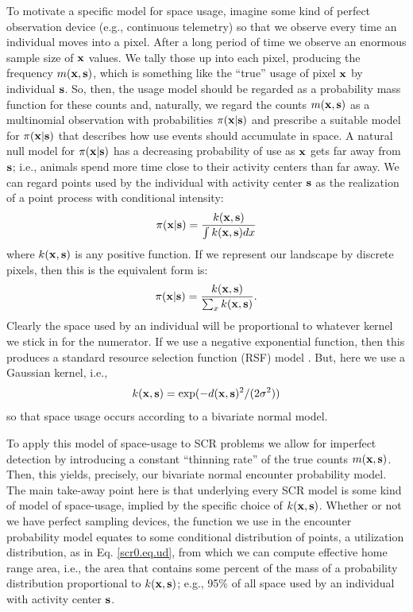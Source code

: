 To motivate a specific model for space usage, imagine some kind of
perfect observation device (e.g., continuous telemetry) so that we
observe every time an individual moves into a pixel. After a long
period of time we observe an enormous sample size of ${\bf x}$
values. We tally those up into each pixel, producing the frequency
$m({\bf x},{\bf s})$, which is something like the ``true'' usage of
pixel ${\bf x}$ by individual ${\bf s}$.  So, then, the usage model should be regarded as a probability
mass function for these counts and, naturally, we regard the counts
$m({\bf x},{\bf s})$
as a multinomial observation with probabilities $\pi({\bf x}|{\bf s})$ and
prescribe a suitable model for $\pi({\bf x}|{\bf s})$ that describes how use
events should accumulate in space. A natural null model for
$\pi({\bf x}|{\bf s})$ has a decreasing probability of use as ${\bf x}$ gets far away
from ${\bf s}$; i.e., animals spend more time close to their activity
centers than far away.
We can regard points used by the individual
with activity center ${\bf s}$ as the realization of a point process with
conditional intensity:
\[
\pi({\bf x}|{\bf s}) =  \frac{ k({\bf x},{\bf s}) }{ \int k({\bf
    x},{\bf s}) dx }
\]
where $k({\bf x},{\bf s})$ is any positive function.
If we represent our landscape by discrete pixels, then this is the
equivalent form is:
\begin{equation}
\pi({\bf x}|{\bf s}) =  \frac{ k({\bf x},{\bf s}) }{ \sum_{x} k({\bf
    x},{\bf s}) }.
\label{scr0.eq.ud}
\end{equation}
Clearly the space used by an individual will be proportional
to whatever kernel we stick in for the numerator.
If we use a negative exponential function, then this produces a
standard
resource selection function (RSF) model
\citep[e.g.,][Ch. 8]{manly_etal:2002}.
But, here we use a Gaussian kernel, i.e.,
\[
 k({\bf x},{\bf s})= \exp(  -d({\bf x},{\bf s})^{2}/(2\sigma^{2}))
\]
so that space usage occurs according to a bivariate normal model.

To apply this model of space-usage to SCR problems we  allow for imperfect
detection by introducing a constant ``thinning rate'' of the true
counts $m({\bf x},{\bf s})$. Then, this
yields, precisely, our bivariate normal encounter probability model.
The main take-away point here is that underlying every SCR model is
some kind of model of space-usage, implied by the
specific choice of $k({\bf x},{\bf s})$.
Whether or not we have perfect sampling devices, the function we use
in the encounter probability model equates to some conditional
distribution of points, a utilization distribution,
 as in
Eq. \ref{scr0.eq.ud}, from which we can compute effective home range
area, i.e., the area that contains some percent of the mass of a
probability distribution proportional to
 $k({\bf x},{\bf
  s})$; e.g.,  95\% of all space used by an individual with activity
center ${\bf s}$.


